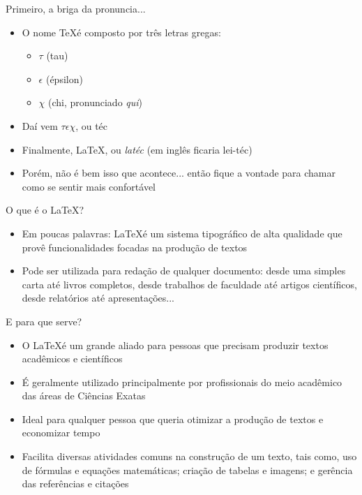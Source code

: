 \begin{frame}{Primeiro, a briga da pronuncia...}
    \begin{itemize}
        \item  O nome \TeX é composto por três letras gregas:
        \begin{itemize}
            \item $\tau$ (tau)
            \item $\epsilon$ (épsilon)
            \item $\chi$ (chi, pronunciado \textit{qui})
        \end{itemize}
        \item Daí vem $\tau$$\epsilon$$\chi$, ou téc
        \item Finalmente, \LaTeX, ou \textit{latéc} (em inglês ficaria lei-téc)
        \item Porém, não é bem isso que acontece... então fique a vontade para chamar como se sentir mais confortável
    \end{itemize}
    

\end{frame}
%

\begin{frame}{O que é o \LaTeX?}
    \begin{itemize}
        \item Em poucas palavras:  \LaTeX é um sistema tipográfico de alta qualidade que provê funcionalidades focadas na produção de textos
        \item  Pode ser utilizada para redação de qualquer documento: desde uma simples carta até livros completos, desde trabalhos de faculdade até artigos científicos, desde relatórios até apresentações...
    \end{itemize}
\end{frame}
%

\begin{frame}{E para que serve?}
    \begin{itemize}
        \item O \LaTeX é um grande aliado para pessoas que precisam produzir textos acadêmicos e científicos
        \item É geralmente utilizado principalmente por profissionais do meio acadêmico das áreas de Ciências Exatas
        \item Ideal para qualquer pessoa que queria otimizar a produção de textos e economizar tempo
        \item Facilita diversas atividades comuns na construção de um texto, tais como, uso de fórmulas e equações matemáticas; criação de tabelas e imagens; e gerência das referências e citações
    \end{itemize}
\end{frame}

